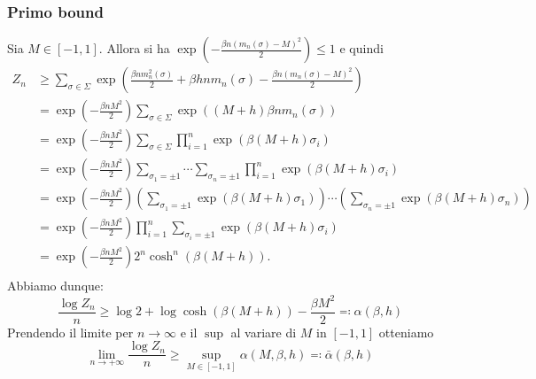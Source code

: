 \subsubsection{Primo bound}
Sia $ M \in [-1,1] $. Allora si ha $ \exp\left( -\frac{\beta n (m_n(\sigma) - M)^2}{2} \right) \leq 1 $ e quindi
\begin{align*}
    Z_n & \geq \sum_{\sigma \in \Sigma} \exp\left( \frac{\beta n m_n^2(\sigma)}{2} + \beta h n m_n(\sigma) - \frac{\beta n (m_n(\sigma)-M)^2}{2}\right) \\
        & = \exp\left( -\frac{\beta n M^2}{2} \right) \sum_{\sigma \in \Sigma} \exp\left( (M+h) \beta n m_n(\sigma) \right)                              \\
        & = \exp\left( -\frac{\beta n M^2}{2} \right) \sum_{\sigma \in \Sigma} \prod_{i=1}^{n} \exp( \beta(M+h) \sigma_i )                               \\
        & = \exp\left( -\frac{\beta n M^2}{2} \right) \sum_{\sigma_1 = \pm 1} \cdots \sum_{\sigma_n = \pm 1} \prod_{i=1}^{n} \exp( \beta(M+h) \sigma_i ) \\
        & = \exp\left( -\frac{\beta n M^2}{2} \right) \left(\sum_{\sigma_1 = \pm 1} \exp(\beta(M+h)\sigma_1)\right) \cdots \left(\sum_{\sigma_n = \pm 1} \exp(\beta(M+h)\sigma_n)\right) \\
        & = \exp\left( -\frac{\beta n M^2}{2} \right) \prod_{i=1}^{n} \sum_{\sigma_i = \pm 1} \exp(\beta(M+h)\sigma_i) \\
        & = \exp\left( -\frac{\beta n M^2}{2} \right) 2^n \cosh^n(\beta(M+h)). \\
\end{align*}
Abbiamo dunque:
\[ \frac{\log Z_n}{n} \geq \log 2 + \log\cosh(\beta(M+h)) - \frac{\beta M^2}{2} \eqqcolon \alpha(\beta, h) \]
Prendendo il limite per $ n\to\infty $ e il $ \sup $ al variare di $ M $ in $ [-1,1] $ otteniamo
\[ \lim_{n \to +\infty}\frac{\log Z_n}{n} \geq \sup_{M\in[-1,1]} \alpha(M, \beta, h) \eqqcolon \bar{\alpha}(\beta, h) \]

